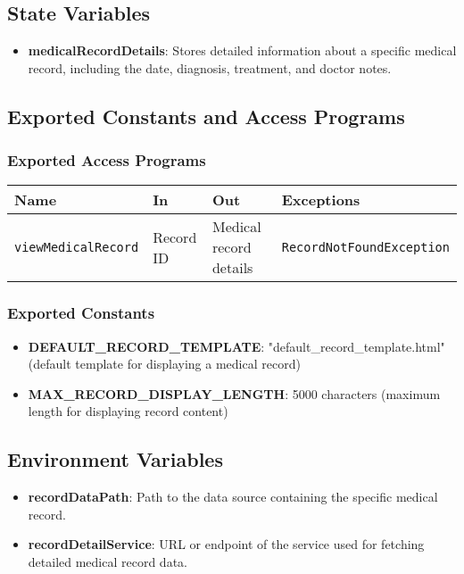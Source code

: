 \documentclass[12pt, titlepage]{article}
\begin{document}
\subsection{State Variables}
\begin{itemize}
\item \textbf{medicalRecordDetails}: Stores detailed information about a specific medical record, including the date, diagnosis, treatment, and doctor notes.
\end{itemize}

\subsection{Exported Constants and Access Programs}
\subsubsection{Exported Access Programs}
\begin{tabular}{|l|l|l|l|}
    \hline
    \textbf{Name} & \textbf{In} & \textbf{Out} & \textbf{Exceptions} \\
    \hline 
    \texttt{viewMedicalRecord} & Record ID & Medical record details & \texttt{RecordNotFoundException} \\
    \hline
\end{tabular}

\subsubsection{Exported Constants}
\begin{itemize}
\item \textbf{DEFAULT\_RECORD\_TEMPLATE}: "default\_record\_template.html" (default template for displaying a medical record)
\item \textbf{MAX\_RECORD\_DISPLAY\_LENGTH}: 5000 characters (maximum length for displaying record content)
\end{itemize}

\subsection{Environment Variables}
\begin{itemize}
\item \textbf{recordDataPath}: Path to the data source containing the specific medical record.
\item \textbf{recordDetailService}: URL or endpoint of the service used for fetching detailed medical record data.
\end{itemize}
\end{document}
